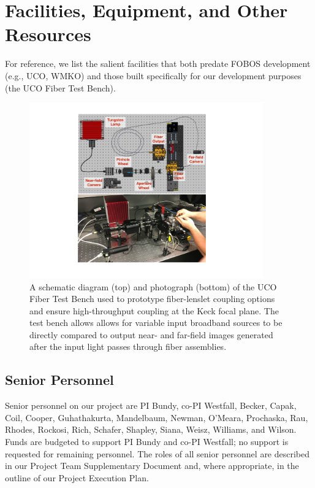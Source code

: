 \documentclass[oneside,11pt]{amsart}
\begin{document}


\vspace*{-1.5cm}

\section*{Facilities, Equipment, and Other Resources}

\noindent For reference, we list the salient facilities that both
predate FOBOS development (e.g., UCO, WMKO) and those built specifically
for our development purposes (the UCO Fiber Test Bench).

\begin{figure}[h!]
%
\includegraphics[width=0.9\textwidth]{figs/test_bench.pdf}
%
\caption{\small  A schematic diagram (top) and photograph (bottom) of
the UCO Fiber Test Bench used to prototype fiber-lenslet coupling
options and ensure high-throughput coupling at the Keck focal plane.
The test bench allows allows for variable input broadband sources to be
directly compared to output near- and far-field images generated after
the input light passes through fiber assemblies.}
%
\label{fig:testbench}
%
\end{figure}


\subsection*{Senior Personnel}

Senior personnel on our project are PI Bundy, co-PI Westfall, Becker,
Capak, Coil, Cooper, Guhathakurta, Mandelbaum, Newman, O'Meara,
Prochaska, Rau, Rhodes, Rockosi, Rich, Schafer, Shapley, Siana, Weisz,
Williams, and Wilson.  Funds are budgeted to support PI Bundy and co-PI
Westfall; no support is requested for remaining personnel.  The roles of
all senior personnel are described in our Project Team Supplementary
Document and, where appropriate, in the outline of our Project
Execution Plan. 
\end{document}

